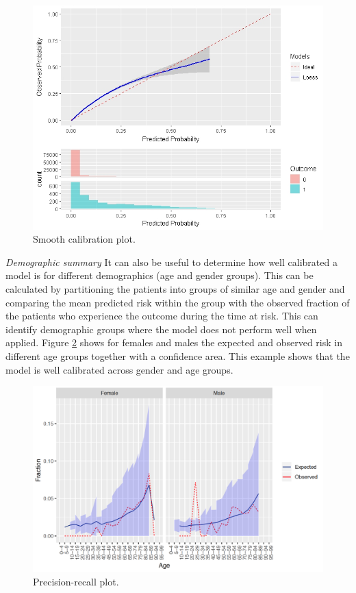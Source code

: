\documentclass[11pt]{book}
\theoremstyle{definition}
\theoremstyle{definition}
\theoremstyle{definition}
\theoremstyle{remark}
\begin{document}
\begin{figure}

{\centering \includegraphics[width=1\linewidth]{images/PatientLevelPrediction/smoothCalibration} 

}

\caption{Smooth calibration plot.}\label{fig:plpSmoothCal}
\end{figure}

\emph{Demographic summary}
It can also be useful to determine how well calibrated a model is for different demographics (age and gender groups). This can be calculated by partitioning the patients into groups of similar age and gender and comparing the mean predicted risk within the group with the observed fraction of the patients who experience the outcome during the time at risk. This can identify demographic groups where the model does not perform well when applied. Figure \ref{fig:plpDemoSummary} shows for females and males the expected and observed risk in different age groups together with a confidence area. This example shows that the model is well calibrated across gender and age groups.

\begin{figure}

{\centering \includegraphics[width=1\linewidth]{images/PatientLevelPrediction/demographicSummary} 

}

\caption{Precision-recall plot.}\label{fig:plpDemoSummary}
\end{figure}
\end{document}
